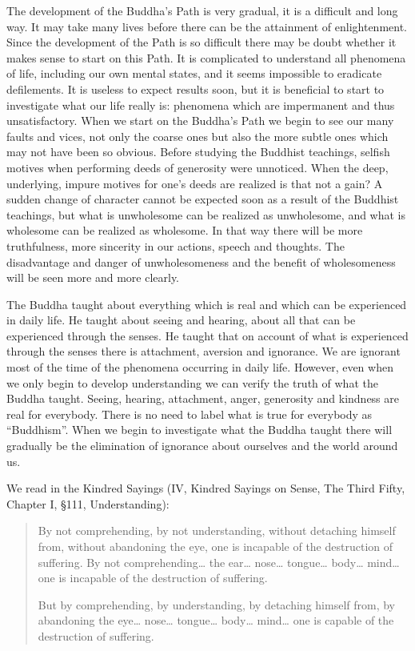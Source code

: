 \documentclass{book}
\begin{document}
The development of the Buddha's Path is very gradual, it is a difficult
and long way. It may take many lives before there can be the attainment
of enlightenment. Since the development of the Path is so difficult
there may be doubt whether it makes sense to start on this Path. It is
complicated to understand all phenomena of life, including our own
mental states, and it seems impossible to eradi­cate defilements. It is
useless to expect results soon, but it is beneficial to start to
investigate what our life really is: phenomena which are impermanent and
thus unsatis­factory. When we start on the Buddha's Path we begin to see
our many faults and vices, not only the coarse ones but also the more
subtle ones which may not have been so obvious. Before studying the
Buddhist teachings, selfish motives when performing deeds of generosity
were un­noticed. When the deep, underlying, impure motives for one's
deeds are realized is that not a gain? A sudden change of character
cannot be expected soon as a result of the Buddhist teachings, but what
is unwholesome can be realized as unwholesome, and what is wholesome can
be realized as wholesome. In that way there will be more truthfulness,
more sincerity in our actions, speech and thoughts. The disadvantage and
danger of unwholesome­ness and the benefit of wholesomeness will be seen
more and more clearly.

The Buddha taught about everything which is real and which can be
experienced in daily life. He taught about seeing and hearing, about all
that can be experienced through the senses. He taught that on account of
what is experienced through the senses there is attachment, aver­sion
and ignorance. We are ignorant most of the time of the phenomena
occurring in daily life. However, even when we only begin to develop
understanding we can verify the truth of what the Buddha taught. Seeing,
hearing, attachment, anger, generosity and kindness are real for
everybody. There is no need to label what is true for everybody as
``Buddhism''. When we begin to investigate what the Buddha taught there
will gradually be the elimination of ignorance about ourselves and the
world around us.

We read in the Kindred Sayings (IV, Kindred Sayings on Sense, The Third
Fifty, Chapter I, §111, Understanding):

\begin{quote}
By not comprehending, by not understanding, without detaching himself
from, without abandoning the eye, one is incapable of the destruction of
suffering. By not comprehending\ldots{} the ear\ldots{} nose\ldots{}
tongue\ldots{} body\ldots{} mind\ldots{} one is incapable of the
destruction of suffering.

But by comprehending, by understanding, by detaching himself from, by
abandoning the eye\ldots{} nose\ldots{} tongue\ldots{} body\ldots{}
mind\ldots{} one is capable of the destruction of suffering.
\end{quote}
\end{document}
